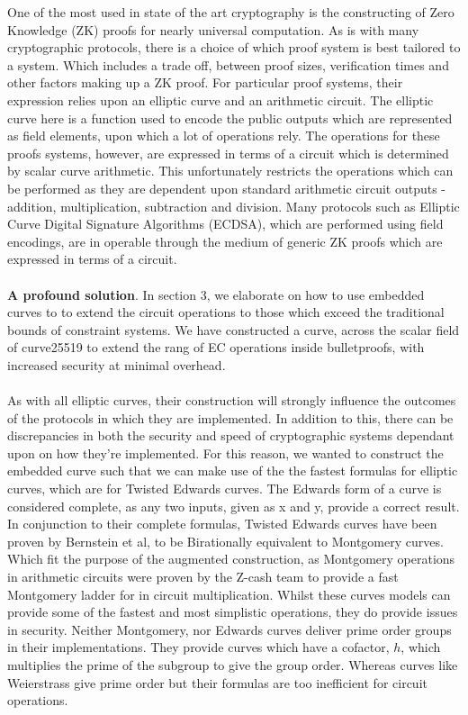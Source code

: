 \documentclass{article}
\theoremstyle{definition}
\theoremstyle{remark}
\begin{document}
	One of the most used in state of the art cryptography is the constructing of Zero Knowledge (ZK) proofs for nearly universal computation. As is with many cryptographic protocols, there is a choice of which proof system is best tailored to a system. Which includes a trade off, between proof sizes, verification times and other factors making up a ZK proof.  For particular proof systems, their expression relies upon an elliptic curve and an arithmetic circuit. The elliptic curve here is a function used to encode the public outputs which are represented as field elements, upon which a lot of operations rely. The operations for these proofs systems, however, are expressed in terms of a circuit which is determined by scalar curve arithmetic. This unfortunately restricts the operations which can be performed as they are dependent upon standard arithmetic circuit outputs - addition, multiplication, subtraction and division. Many protocols such as Elliptic Curve Digital Signature Algorithms (ECDSA), which are performed using field encodings, are in operable through the medium of generic ZK proofs which are expressed in terms of a circuit. \\\\ 
	
	{\bf A profound solution}.
	In section 3, we elaborate on how to use embedded curves to to extend the circuit operations to those which exceed the traditional bounds of constraint systems. We have constructed a curve, across the scalar field of curve25519 to extend the rang of EC operations inside bulletproofs, with increased security at minimal overhead.\\\\
	As with all elliptic curves, their construction will strongly influence the outcomes of the protocols in which they are implemented. In addition to this, there can be discrepancies in both the security and speed of cryptographic systems dependant upon on how they're implemented. For this reason, we wanted to construct the embedded curve such that we can make use of the the fastest formulas for elliptic curves, which are for Twisted Edwards curves. The Edwards form of a curve is considered complete, as any two inputs, given as x and y, provide a correct result. In conjunction to their complete formulas, Twisted Edwards curves have been proven by Bernstein et al, to be Birationally equivalent to Montgomery curves. Which fit the purpose of the augmented construction, as Montgomery operations in arithmetic circuits were proven by the Z-cash team to provide a fast Montgomery ladder for in circuit multiplication. Whilst these curves models can provide some of the fastest and most simplistic operations, they do provide issues in security. Neither Montgomery, nor Edwards curves deliver prime order groups in their implementations. They provide curves which have a cofactor, $h$, which multiplies the prime of the subgroup to give the group order. Whereas curves like Weierstrass give prime order but their formulas are too inefficient for circuit operations.\\\\ 
	
\end{document}
